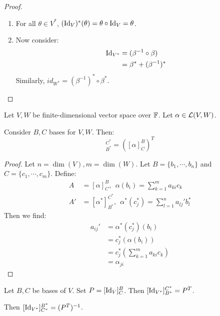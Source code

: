 \documentclass[../Main.tex]{subfiles}
\begin{document}
\begin{proof}
\begin{enumerate}
\begin{align*}
            \end{align*}
            We again conclude that, since $\theta$ was arbitrary,
            \begin{equation*}
                (\alpha \circ \gamma)^* = \gamma^* \circ \alpha^*
            \end{equation*}
        \item For all $\theta \in V^*$, $(\operatorname{Id}_V)^*(\theta) = \theta \circ \operatorname{Id}_V = \theta$.
        \item Now consider:
            \begin{align*}
                \operatorname{Id}_{V^*} &= (\beta^{-1} \circ \beta) \\
                &= \beta^* + (\beta^{-1})^*
            \end{align*}
            Similarly, $id_{W^*} = (\beta^{-1})^* \circ \beta^*$.
    \end{enumerate}
\end{proof}
\begin{proposition}
    Let $V, W$ be finite-dimensional vector space over $\mathbb{F}$. Let $\alpha \in \mathcal{L}(V, W)$.

    Consider $B, C$ bases for $V, W$. Then:
    \begin{equation*}
        [\alpha^*]_{B^*}^{C^*} = \left([\alpha]_C^B\right)^T
    \end{equation*}
    \label{propDLMIsTranspose}
\end{proposition}
\begin{proof}
    Let $n = \dim(V), m = \dim(W)$. Let $B = \{b_1, \cdots, b_n\}$ and $C = \{c_1, \cdots, c_m\}$. Define:
    \begin{align*}
        A &= [\alpha]_C^B,~~\alpha(b_i) = \sum_{k=1}^{m} a_{ki} c_k \\
        A' &= [\alpha^*]_{B^*}^{C^*},~~\alpha^*(c_j^*) = \sum_{l=1}^{n}a_{lj}' b_l^*
    \end{align*}
    Then we find:
    \begin{align*}
        a_{ij}' &=\alpha^*(c_j^*)(b_i) \\
        &= c_j^*(\alpha(b_i)) \\
        &= c_j^* \left(\sum_{k=1}^{m} a_{ki} c_k\right) \\
        &= \alpha_{ji}
    \end{align*}
\end{proof}
\begin{example}
    Let $B, C$ be bases of $V$. Set $P = [\operatorname{Id}_V]_C^B$. Then $[\operatorname{Id}_{V^*}]_{B^*}^{C^*} = P^T$.

    Then $[\operatorname{Id}_{V^*}]_{C^*}^{B^*} = (P^T)^{-1}$.
\end{example}
\end{document}
